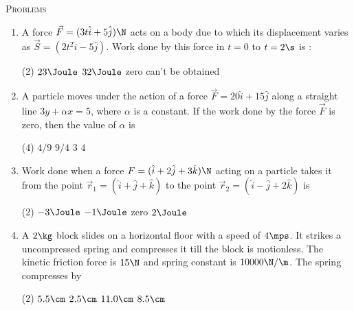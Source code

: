 \documentclass{article}
\renewcommand{\ans}{\quad}
\begin{document}
\begin{center}
    \textsc{Problems}
\end{center}
\begin{enumerate}

    \item A force $\vec{F}=(3t\hat{i} + 5\hat{j})\N$ acts on a body due to which its displacement varies as $\vec{S}=(2t^2\hat{i}-5\hat{j})$. Work done by this force in $t=0$ to $t=2\s$ is :
        \begin{tasks}(2)
            \task $23 \Joule$
            \task $32 \Joule$\ans
            \task zero
            \task can't be obtained 
        \end{tasks}

    \item A particle moves under the action of a force $\vec{F}=20\hat{i} + 15\hat{j}$ along a straight line $3y +\alpha x =5$, where $\alpha$ is a constant. If the work done by the force $\vec{F}$ is zero, then the value of $\alpha$ is
        \begin{tasks}(4)
            \task $4/9$
            \task $9/4$
            \task $3$
            \task $4$\ans
        \end{tasks}

    \item Work done when a force $F=(\hat{i}+2\hat{j}+3\hat{k})\N$ acting on a particle takes it from the point $\vec{r}_1 = (\hat{i} + \hat{j} + \hat{k} )$ to the point $\vec{r}_2 = (\hat{i} - \hat{j} + 2 \hat{k} )$ is
        \begin{tasks}(2)
            \task $-3\Joule$
            \task $-1\Joule$\ans
            \task zero
            \task $2\Joule$
        \end{tasks}

    \item A $2 \kg$ block slides on a horizontal floor with a speed of $4 \mps$. It strikes a uncompressed spring and compresses it till the block is motionless. The kinetic friction force is $15 \N$ and spring constant is $10000 \N/\m$. The spring compresses by
        \begin{center}
        \end{center}
        \begin{tasks}(2)
            \task $5.5\cm$ \ans
            \task $2.5\cm$ 
            \task $11.0\cm$
            \task $8.5\cm$
        \end{tasks}


\end{enumerate}
\end{document}
